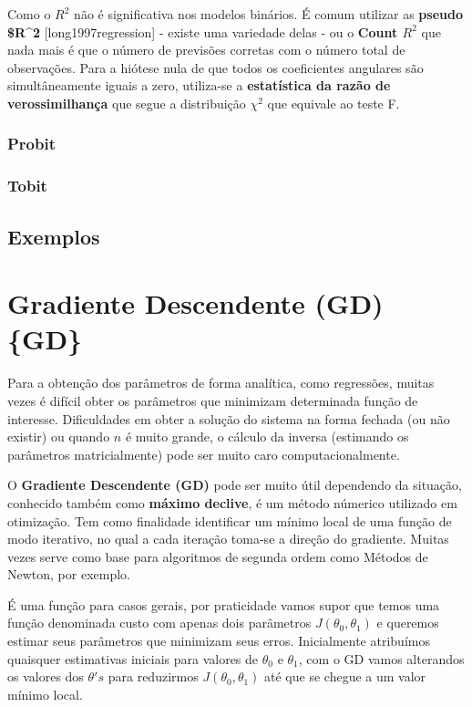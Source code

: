 \documentclass[
]{book}
\begin{document}
Como o \(R^2\) não é significativa nos modelos binários. É comum utilizar as \textbf{pseudo \$R\^{}2} {[}long1997regression{]} - existe uma variedade delas - ou o \textbf{Count \(R^2\)} que nada mais é que o número de previsões corretas com o número total de observações. Para a hiótese nula de que todos os coeficientes angulares são simultâneamente iguais a zero, utiliza-se a \textbf{estatística da razão de verossimilhança} que segue a distribuição \(\chi^2\) que equivale ao teste F.

\hypertarget{probit}{%
\subsubsection{Probit}\label{probit}}

\hypertarget{tobit}{%
\subsubsection{Tobit}\label{tobit}}

\hypertarget{exemplos}{%
\subsection{Exemplos}\label{exemplos}}

\hypertarget{gradiente-descendente-gd-gd}{%
\section{Gradiente Descendente (GD) \{GD\}}\label{gradiente-descendente-gd-gd}}

Para a obtenção dos parâmetros de forma analítica, como regressões, muitas vezes é difícil obter os parâmetros que minimizam determinada função de interesse. Dificuldades em obter a solução do sistema na forma fechada (ou não existir) ou quando \(n\) é muito grande, o cálculo da inversa (estimando os parâmetros matricialmente) pode ser muito caro computacionalmente.

O \textbf{Gradiente Descendente (GD)} pode ser muito útil dependendo da situação, conhecido também como \textbf{máximo declive}, é um método númerico utilizado em otimização. Tem como finalidade identificar um mínimo local de uma função de modo iterativo, no qual a cada iteração toma-se a direção do gradiente. Muitas vezes serve como base para algoritmos de segunda ordem como Métodos de Newton, por exemplo.

É uma função para casos gerais, por praticidade vamos supor que temos uma função denominada custo com apenas dois parâmetros \(J(\theta_0,\theta_1)\) e queremos estimar seus parâmetros que minimizam seus erros. Inicialmente atribuímos quaisquer estimativas iniciais para valores de \(\theta_0\) e \(\theta_1\), com o GD vamos alterandos os valores dos \(\theta's\) para reduzirmos \(J(\theta_0,\theta_1)\) até que se chegue a um valor mínimo local.
\end{document}
